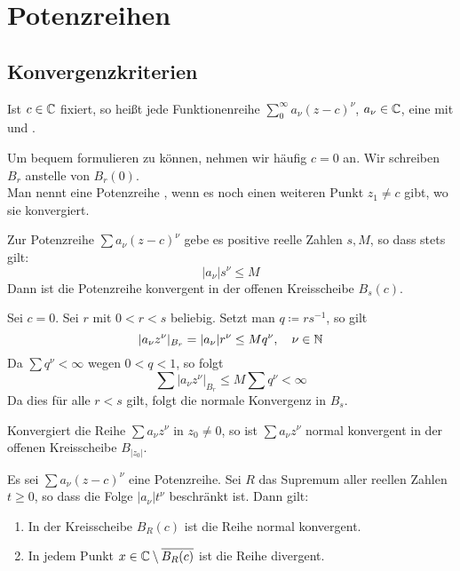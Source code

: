 \chapter{Potenzreihen}
\section{Konvergenzkriterien}
\begin{definition}
	Ist $ c\in\mathbb{C} $ fixiert,  so hei\ss t jede Funktionenreihe $ \sum_{0}^{\infty}a_\nu(z-c)^\nu $, $ a_\nu\in\mathbb{C} $, eine  mit  und . 
\end{definition}
Um bequem formulieren zu k\"onnen, nehmen wir h\"aufig $ c=0 $ an. Wir schreiben $ B_r $ anstelle von $ B_r(0) $.\\
Man nennt eine Potenzreihe , wenn es noch einen weiteren Punkt $ z_1\neq c $ gibt, wo sie konvergiert.\\
\begin{lemma}
	Zur Potenzreihe $ \sum a_\nu(z-c)^\nu $ gebe es positive reelle Zahlen $ s,M $, so dass stets gilt:
	\[ |a_\nu|s^\nu\leq M \]
	Dann ist die Potenzreihe konvergent in der offenen Kreisscheibe $ B_s(c) $.
\end{lemma}
\begin{beweis}
	Sei $ c=0 $. Sei $ r $ mit $ 0<r<s $ beliebig. Setzt man $ q\coloneqq rs^{-1} $, so gilt
	\[ |a_\nu z^\nu|_{B_r}=|a_\nu|r^\nu\leq Mq^\nu,\quad \nu\in\mathbb{N} \]
	Da $ \sum q^\nu<\infty $ wegen $ 0<q<1 $, so folgt
	\[ \sum|a_\nu z^\nu|_{B_r}\leq M\sum q^\nu<\infty \]
	Da dies f\"ur alle $ r<s $ gilt, folgt die normale Konvergenz in $ B_s $.
\end{beweis}
\begin{korollar}
	Konvergiert die Reihe $ \sum a_\nu z^\nu $ in $ z_0\neq 0 $, so ist $ \sum a_\nu z^\nu $ normal konvergent in der offenen Kreisscheibe $ B_{|z_0|} $.
\end{korollar}
\begin{satz}
	Es sei $ \sum a_\nu(z-c)^\nu $ eine Potenzreihe. Sei $ R $ das Supremum aller reellen Zahlen $ t\geq 0 $, so dass die Folge $ |a_\nu| t^\nu $ beschr\"ankt ist. Dann gilt:
	\begin{enumerate}
		\item In der Kreisscheibe $ B_R(c) $ ist die Reihe normal konvergent.
		\item In jedem Punkt $ x\in\mathbb{C}\setminus \overline{B_R(c)} $ ist die Reihe divergent.
	\end{enumerate}
\end{satz}
